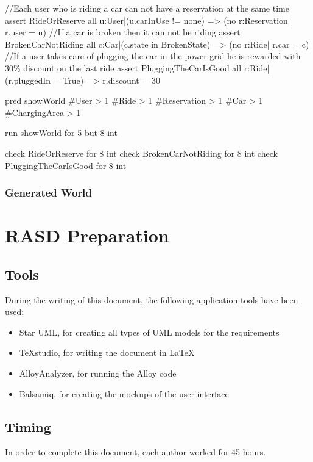 \documentclass[11pt,a4paper]{report}
\begin{document}
\begin{alloyCode}
//Each user who is riding a car can not have a reservation at the same time
assert RideOrReserve{
	all u:User|(u.carInUse != none) => (no r:Reservation | r.user = u)
}
//If a car is broken then it can not be riding
assert BrokenCarNotRiding{
	all c:Car|(c.state in BrokenState) => (no r:Ride| r.car = c)
}
//If a user takes care of plugging the car in the power grid he is rewarded with 30\% discount on the last ride
assert PluggingTheCarIsGood{
	all r:Ride|(r.pluggedIn = True) => r.discount = 30
}

pred showWorld{
	#User > 1
	#Ride > 1 
	#Reservation > 1
	#Car > 1 
	#ChargingArea > 1
}

run showWorld for 5 but 8 int

check RideOrReserve for 8 int
check BrokenCarNotRiding for 8 int
check PluggingTheCarIsGood for 8 int
\end{alloyCode}
\vspace*{0.3cm} %
\subsection{Generated World}

\chapter{RASD Preparation}
\section{Tools}
During the writing of this document, the following application tools have been used:
\begin{itemize}
	\item Star UML, for creating all types of UML models for the requirements
	\item TeXstudio, for writing the document in \LaTeX
	\item AlloyAnalyzer, for running the Alloy code
	\item Balsamiq, for creating the mockups of the user interface
\end{itemize}
\section{Timing}
In order to complete this document, each author worked for 45 hours.
%
\end{document}
